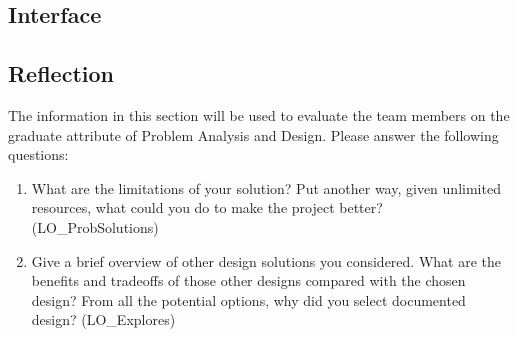 \documentclass[12pt, titlepage]{article}
\begin{document}
\subsection{Interface}


\subsection{Reflection}

The information in this section will be used to evaluate the team members on the graduate attribute
of Problem Analysis and Design. Please answer the following questions:

\begin{enumerate}
	\item What are the limitations of your solution? Put another way, given unlimited resources, what could
	      you do to make the project better? (LO\_ProbSolutions)
	\item Give a brief overview of other design solutions you considered. What are the benefits and tradeoffs
	      of those other designs compared with the chosen design? From all the potential options, why did you
	      select documented design? (LO\_Explores)
\end{enumerate}
\end{document}
